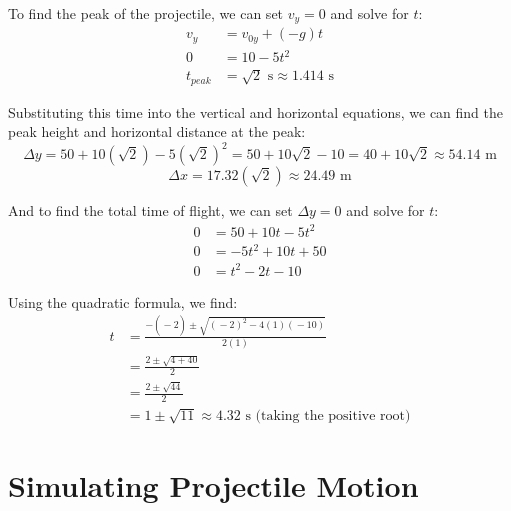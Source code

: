 To find the peak of the projectile, we can set $v_y = 0$ and solve for $t$:
\begin{align*}
    v_y &= v_{0y} + (-g) t \\
    0 &= 10 - 5t^2 \\
    t_{peak} &= \sqrt{2} \text{ s} \approx 1.414 \text{ s}
\end{align*}

Substituting this time into the vertical and horizontal equations, we can find the peak height and horizontal distance at the peak:
\[
\Delta y = 50 + 10(\sqrt{2}) - 5(\sqrt{2})^2 = 50 + 10\sqrt{2} - 10 = 40 + 10\sqrt{2} \approx 54.14 \text{ m}
\]
\[
\Delta x = 17.32(\sqrt{2}) \approx 24.49 \text{ m}
\]

And to find the total time of flight, we can set $\Delta y = 0$ and solve for $t$:
\begin{align*}
    0 &= 50 + 10t - 5t^2 \\
    0 &= -5t^2 + 10t + 50 \\
    0 &= t^2 - 2t - 10
\end{align*}

Using the quadratic formula, we find:
\begin{align*}
    t &= \frac{- \left(\right. - 2 \left.\right) \pm \sqrt{\left(\right. - 2 \left.\right)^{2} - 4 \left(\right. 1 \left.\right) \left(\right. - 10 \left.\right)}}{2 \left(\right. 1 \left.\right)} \\ 
    &= \frac{2 \pm \sqrt{4 + 40}}{2} \\
    &= \frac{2 \pm \sqrt{44}}{2} \\
    &= 1 \pm \sqrt{11} \approx 4.32 \text{ s (taking the positive root)}
\end{align*}

\section{Simulating Projectile Motion}


